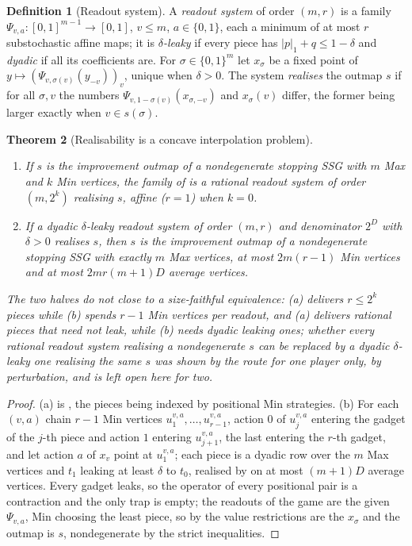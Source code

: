 \documentclass[11pt]{article}
\theoremstyle{plain}
\newtheorem{theorem}{Theorem}[section]
\theoremstyle{definition}
\newtheorem{definition}[theorem]{Definition}
\begin{document}
\begin{definition}[Readout system]\label{def:readout-system}
A \emph{readout system} of order $(m,r)$ is a family
$\Psi_{v,a}:[0,1]^{m-1}\to[0,1]$, $v\le m$, $a\in\{0,1\}$, each a minimum
of at most $r$ substochastic affine maps; it is \emph{$\delta$-leaky} if
every piece has $|p|_1+q\le1-\delta$ and \emph{dyadic} if all its
coefficients are. For $\sigma\in\{0,1\}^{m}$ let $x_\sigma$ be a fixed
point of $y\mapsto(\Psi_{v,\sigma(v)}(y_{-v}))_v$, unique when
$\delta>0$. The system \emph{realises} the outmap $s$ if for all
$\sigma,v$ the numbers $\Psi_{v,1-\sigma(v)}(x_{\sigma,-v})$ and
$x_\sigma(v)$ differ, the former being larger exactly when $v\in s(\sigma)$.
\end{definition}

\begin{theorem}[Realisability is a concave interpolation problem]\label{thm:readout-realise}
\begin{enumerate}[label=(\alph*),leftmargin=2.2em]
\item If $s$ is the improvement outmap of a nondegenerate stopping SSG
      with $m$ Max and $k$ Min vertices, the family of
       is a rational readout system of order
      $(m,2^{k})$ realising $s$, affine ($r=1$) when $k=0$.
\item If a dyadic $\delta$-leaky readout system of order $(m,r)$ and
      denominator $2^{D}$ with $\delta>0$ realises $s$, then $s$ is the
      improvement outmap of a nondegenerate stopping SSG with exactly
      $m$ Max vertices, at most $2m(r-1)$ Min vertices and at most
      $2mr(m+1)D$ average vertices.
\end{enumerate}
The two halves do not close to a size-faithful equivalence: (a) delivers
$r\le2^{k}$ pieces while (b) spends $r-1$ Min vertices per readout, and
(a) delivers rational pieces that need not leak, while (b) needs dyadic
leaking ones; whether every rational readout system realising a
nondegenerate $s$ can be replaced by a dyadic $\delta$-leaky one
realising the same $s$ was shown by the route for one player only, by
perturbation, and is left open here for two.
\end{theorem}

\begin{proof}
(a) is , the pieces being indexed
by positional Min strategies. (b) For each $(v,a)$ chain $r-1$ Min
vertices $u^{v,a}_1,\dots,u^{v,a}_{r-1}$, action $0$ of $u^{v,a}_j$
entering the gadget of the $j$-th piece and action $1$ entering
$u^{v,a}_{j+1}$, the last entering the $r$-th gadget, and let action $a$
of $x_v$ point at $u^{v,a}_1$; each piece is a dyadic row over the $m$
Max vertices and $t_1$ leaking at least $\delta$ to $t_0$, realised by
 on at most $(m+1)D$ average vertices. Every gadget
leaks, so the operator of every positional pair is a contraction and the
only trap is empty; the readouts of the game are the given $\Psi_{v,a}$,
Min choosing the least piece, so by  the value
restrictions are the $x_\sigma$ and the outmap is $s$, nondegenerate by
the strict inequalities.
\end{proof}
\end{document}
